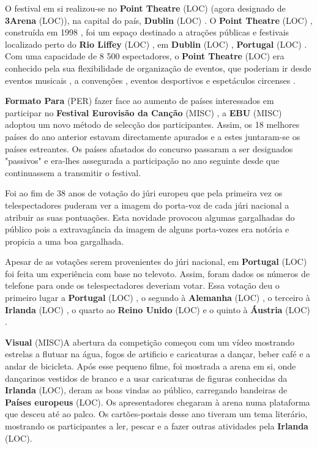 \documentclass[12pt,a4paper]{article}
\begin{document}
O festival em si realizou-se no \textbf{Point Theatre} (LOC) (agora designado de \textbf{3Arena} (LOC)), na capital do país, \textbf{Dublin} (LOC) . O \textbf{Point Theatre} (LOC) , construída em 1998 , foi um espaço destinado a atrações públicas e festivais localizado perto do \textbf{Rio Liffey} (LOC) , em \textbf{Dublin} (LOC) , \textbf{Portugal} (LOC) . Com uma capacidade de 8 500 espectadores, o \textbf{Point Theatre} (LOC) era conhecido pela sua flexibilidade de organização de eventos, que poderiam ir desde eventos musicais , a convenções , eventos desportivos e espetáculos circenses .



\textbf{Formato Para} (PER) fazer face ao aumento de países interessados em participar no \textbf{Festival Eurovisão da Canção} (MISC) , a \textbf{EBU} (MISC) adoptou um novo método de selecção dos participantes. Assim, os 18 melhores países do ano anterior estavam directamente apurados e a estes juntaram-se os países estreantes. Os países afastados do concurso passaram a ser designados "passivos" e era-lhes assegurada a participação no ano seguinte desde que continuassem a transmitir o festival.

Foi ao fim de 38 anos de votação do júri europeu que pela primeira vez os telespectadores puderam ver a imagem do porta-voz de cada júri nacional a atribuir as suas pontuações. Esta novidade provocou algumas gargalhadas do público pois a extravagância da imagem de alguns porta-vozes era notória e propicia a uma boa gargalhada.

Apesar de as votações serem provenientes do júri nacional, em \textbf{Portugal} (LOC) foi feita um experiência com base no televoto. Assim, foram dados os números de telefone para onde os telespectadores deveriam votar. Essa votação deu o primeiro lugar a \textbf{Portugal} (LOC) , o segundo à \textbf{Alemanha} (LOC) , o terceiro à \textbf{Irlanda} (LOC) , o quarto ao \textbf{Reino Unido} (LOC) e o quinto à \textbf{Áustria} (LOC) .



\textbf{Visual} (MISC)A abertura da competição começou com um vídeo mostrando estrelas a flutuar na água, fogos de artificio e caricaturas a dançar, beber café e a andar de bicicleta. Após esse pequeno filme, foi mostrada a arena em si, onde dançarinos vestidos de branco e a usar caricaturas de figuras conhecidas da \textbf{Irlanda} (LOC), deram as boas vindas ao público, carregando bandeiras de \textbf{Países europeus} (LOC). Os apresentadores chegaram à arena numa plataforma que desceu até ao palco. Os cartões-postais desse ano tiveram um tema literário, mostrando os participantes a ler, pescar e a fazer outras atividades pela \textbf{Irlanda} (LOC).
\end{document}
